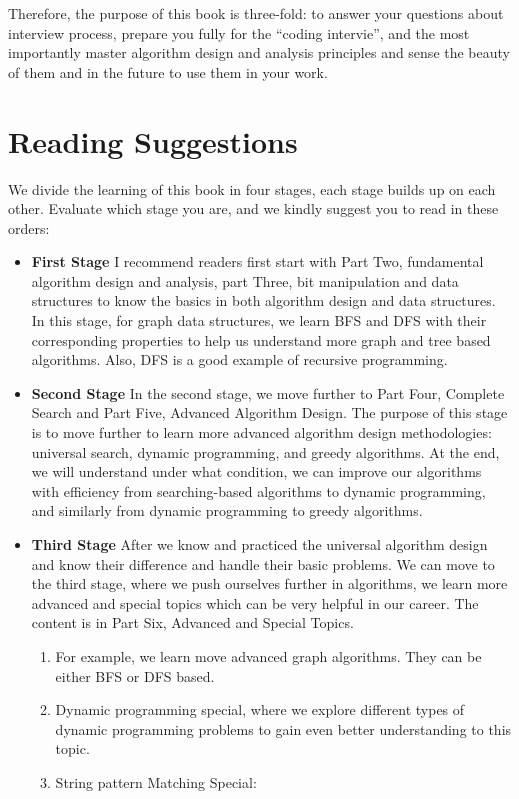 \documentclass[../main.tex]{subfiles}
\begin{document}
Therefore, the purpose of this book is three-fold: to answer your questions about interview process, prepare you fully for the ``coding intervie'', and the most importantly master algorithm design and analysis principles and sense the beauty of them and in the future to use them in your work. 

\section{Reading Suggestions}
We divide the learning of this book in four stages, each stage builds up on each other. Evaluate which stage you are, and we kindly suggest you to read in these orders: 
\begin{itemize}
    \item \textbf{First Stage} I recommend readers first start with Part Two, fundamental algorithm design and analysis, part Three, bit manipulation and data structures to know the basics in both algorithm design and data structures. In this stage, for graph data structures, we learn BFS and DFS with their corresponding properties to help us understand more graph and tree based algorithms. Also, DFS is a good example of recursive programming. 
\item \textbf{Second Stage}
In the second stage, we move further to Part Four, Complete Search and Part Five, Advanced Algorithm Design. The purpose of this stage is to move further to learn more advanced algorithm design methodologies: universal search, dynamic programming, and greedy algorithms. At the end, we will understand under what condition, we can improve our algorithms with efficiency from searching-based algorithms to dynamic programming, and similarly from dynamic programming to greedy algorithms. 
\item \textbf{Third Stage}
After we know and practiced the universal algorithm design and know their difference and handle their basic problems. We can move to the third stage, where we push ourselves further in algorithms, we learn more advanced and special topics which can be very helpful in our career. The content is in Part Six, Advanced and  Special Topics. 
\begin{enumerate}
    \item For example, we learn move advanced graph algorithms. They can be either BFS or DFS based. 
    \item Dynamic programming special, where we explore different types of dynamic programming problems to gain even better understanding to this topic.
    \item String pattern Matching Special: 
\end{enumerate}


\end{itemize}
\end{document}
